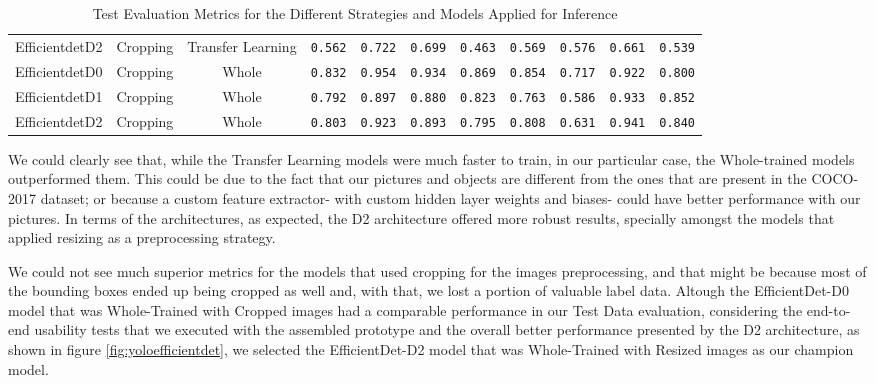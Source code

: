 \documentclass[openright]{normas-utf-tex} %
\begin{document}
\begin{table}[H]
\begin{adjustbox}{width=1\textwidth}
\begin{tabular}{c|c|c|c|c|c|c|c|c|c|c}
		Efficientdet\-D2 & Cropping & Transfer Learning & \texttt{0.562} & \texttt{0.722} & \texttt{0.699} & \texttt{0.463} & \texttt{0.569} & \texttt{0.576} & \texttt{0.661} & \texttt{0.539} \\
		Efficientdet\-D0 & Cropping & Whole & \texttt{0.832} & \texttt{0.954} & \texttt{0.934} & \texttt{0.869} & \texttt{0.854} & \texttt{0.717} & \texttt{0.922} & \texttt{0.800} \\
		Efficientdet\-D1 & Cropping & Whole & \texttt{0.792} & \texttt{0.897} & \texttt{0.880} & \texttt{0.823} & \texttt{0.763} & \texttt{0.586} & \texttt{0.933} & \texttt{0.852} \\
		Efficientdet\-D2 & Cropping & Whole & \texttt{0.803} & \texttt{0.923} & \texttt{0.893} & \texttt{0.795} & \texttt{0.808} & \texttt{0.631} & \texttt{0.941} & \texttt{0.840} \\
		\hline 
	\end{tabular}
	\end{adjustbox}
	\label{tab:modelPerformance}
	\caption[Test Evaluation Metrics for the Different Strategies and Models Applied for Inference]{Test Evaluation Metrics for the Different Strategies and Models Applied for Inference}
\end{table}

We could clearly see that, while the Transfer Learning models were much faster to train,
in our particular case, the Whole-trained models outperformed them. This could be 
due to the fact that our pictures and objects are different from the
ones that are present in the COCO-2017 dataset; or because a custom feature extractor- 
with custom hidden layer weights and biases- could have better performance with our pictures. 
In terms of the architectures, as expected, the D2 architecture offered more robust results, specially
amongst the models that applied resizing as a preprocessing strategy. 

We could not see much superior metrics for the models that used cropping for the images preprocessing, 
and that might be because most of the bounding boxes ended up being cropped as well and, with that, we lost
a portion of valuable label data. Altough the EfficientDet-D0 model that was Whole-Trained with Cropped images
had a comparable performance in our Test Data evaluation, considering the end-to-end usability tests that we executed 
with the assembled prototype and the overall better performance presented by the D2 architecture, as shown in
figure \ref{fig:yoloefficientdet}, we selected the EfficientDet-D2 model that was Whole-Trained with Resized
images as our champion model.
\end{document}
